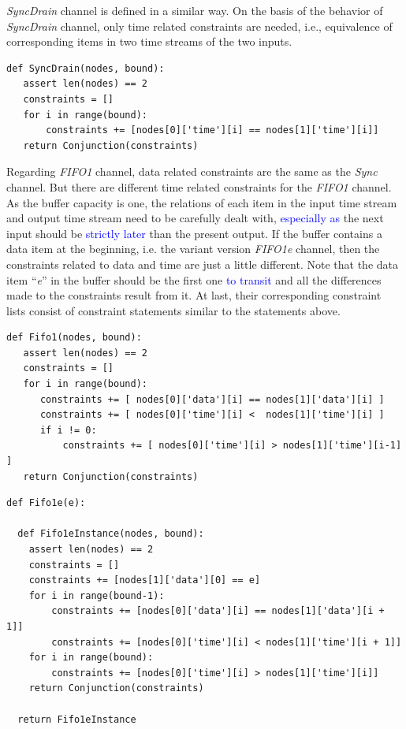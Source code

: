\documentclass[preprint,3p]{elsarticle}
\newcommand{\liyi}[1]{\textcolor{blue}{#1}}
\begin{document}
\emph{SyncDrain} channel is defined in a similar way. On the basis of the behavior of \emph{SyncDrain} channel, only time related constraints are needed, i.e., equivalence of corresponding items in two time streams of the two inputs.
\begin{lstlisting}
def SyncDrain(nodes, bound):
   assert len(nodes) == 2
   constraints = []
   for i in range(bound):
       constraints += [nodes[0]['time'][i] == nodes[1]['time'][i]]
   return Conjunction(constraints)
\end{lstlisting}

Regarding \emph{FIFO1} channel, data related constraints are the same as the \emph{Sync} channel. But there are different time related constraints for the \emph{FIFO1} channel. As the buffer capacity is one, the relations of each item in the input time stream and output time stream need to be carefully dealt with, \liyi{especially as} the next input should be \liyi{strictly later} than the present output. If the buffer contains a data item at the beginning, i.e. the variant version \emph{FIFO1e} channel, then the constraints related to data and time are just a little different. Note that the data item ``\emph{e}'' in the buffer should be the first one \liyi{to transit} and all the differences made to the constraints result from it. At last, their corresponding constraint lists consist of constraint statements similar to the statements above.
\begin{lstlisting}
def Fifo1(nodes, bound):
   assert len(nodes) == 2
   constraints = []
   for i in range(bound):
      constraints += [ nodes[0]['data'][i] == nodes[1]['data'][i] ]
      constraints += [ nodes[0]['time'][i] <  nodes[1]['time'][i] ]
      if i != 0:
          constraints += [ nodes[0]['time'][i] > nodes[1]['time'][i-1] ]
   return Conjunction(constraints)
\end{lstlisting}
\begin{lstlisting}
def Fifo1e(e):

  def Fifo1eInstance(nodes, bound):
    assert len(nodes) == 2
    constraints = []
    constraints += [nodes[1]['data'][0] == e]
    for i in range(bound-1):
        constraints += [nodes[0]['data'][i] == nodes[1]['data'][i + 1]]
        constraints += [nodes[0]['time'][i] < nodes[1]['time'][i + 1]]
    for i in range(bound):
        constraints += [nodes[0]['time'][i] > nodes[1]['time'][i]]
    return Conjunction(constraints)

  return Fifo1eInstance
\end{lstlisting}
\end{document}
